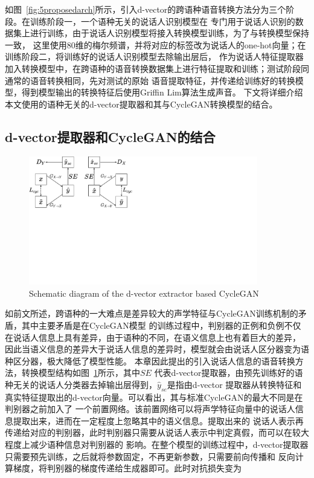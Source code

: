 如图~\ref{fig:5proposedarch}所示，引入d-vector的跨语种语音转换方法分为三个阶段。在训练阶段一，一个语种无关的说话人识别模型在
专门用于说话人识别的数据集上进行训练，由于说话人识别模型将接入转换模型训练，为了与转换模型保持一致，
这里使用80维的梅尔频谱，并将对应的标签改为说话人的one-hot向量；在训练阶段二，将训练好的说话人识别模型去除输出层后，
作为说话人特征提取器加入转换模型中，在跨语种的语音转换数据集上进行特征提取和训练；测试阶段同通常的语音转换相同，先对测试的原始
语音提取特征，并传递给训练好的转换模型，得到模型输出的转换特征后使用Griffin Lim算法生成声音。
下文将详细介绍本文使用的语种无关的d-vector提取器和其与CycleGAN转换模型的结合。



\subsection{d-vector提取器和CycleGAN的结合}

\begin{figure}[!htp]
    \centering
    \includegraphics[width=10cm,trim=0 220 370 0,clip]{figure/5_dvectorcyclegan.pdf}
    {Schematic diagram of the d-vector extractor based CycleGAN}
    \label{fig:dvectorcyclegan}
\end{figure}

如前文所述，跨语种的一大难点是差异较大的声学特征与CycleGAN训练机制的矛盾，其中主要矛盾是在CycleGAN模型
的训练过程中，判别器的正例和负例不仅在说话人信息上具有差异，由于语种的不同，在语义信息上也有着巨大的差异，
因此当语义信息的差异大于说话人信息的差异时，模型就会由说话人区分器变为语种区分器，极大降低了模型性能。
本章因此提出的引入说话人信息的语音转换方法，转换模型结构如图~\ref{fig:dvectorcyclegan}所示，其中$SE$
代表d-vector提取器，由预先训练好的语种无关的说话人分类器去掉输出层得到，$\hat{y}_{se}$是指由d-vector
提取器从转换特征和真实特征提取出的d-vector向量。可以看出，其与标准CycleGAN的最大不同是在判别器之前加入了
一个前置网络。该前置网络可以将声学特征向量中的说话人信息提取出来，进而在一定程度上忽略其中的语义信息。提取出来的
说话人表示再传递给对应的判别器，此时判别器只需要从说话人表示中判定真假，而可以在较大程度上减少语种信息对判别器的
影响。在整个模型的训练过程中，d-vector提取器只需要预先训练，之后就将参数固定，不再更新参数，只需要前向传播和
反向计算梯度，将判别器的梯度传递给生成器即可。此时对抗损失变为

